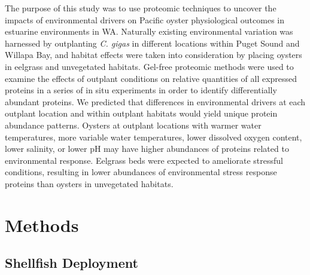 \documentclass [11pt, proquest] {uwthesis}[2015/03/03]
\begin{document}
The purpose of this study was to use proteomic techniques to uncover the impacts of environmental drivers on Pacific oyster physiological outcomes in estuarine environments in WA. Naturally existing environmental variation was harnessed by outplanting \emph{C. gigas} in different locations within Puget Sound and Willapa Bay, and habitat effects were taken into consideration by placing oysters in eelgrass and unvegetated habitats. Gel-free proteomic methods were used to examine the effects of outplant conditions on relative quantities of all expressed proteins in a series of in situ experiments in order to identify differentially abundant proteins. We predicted that differences in environmental drivers at each outplant location and within outplant habitats would yield unique protein abundance patterns. Oysters at outplant locations with warmer water temperatures, more variable water temperatures, lower dissolved oxygen content, lower salinity, or lower pH may have higher abundances of proteins related to environmental response. Eelgrass beds were expected to ameliorate stressful conditions, resulting in lower abundances of environmental stress response proteins than oysters in unvegetated habitats.

\hypertarget{methods}{%
\section{Methods}\label{methods}}

\hypertarget{shellfish-deployment}{%
\subsection{Shellfish Deployment}\label{shellfish-deployment}}
\end{document}

